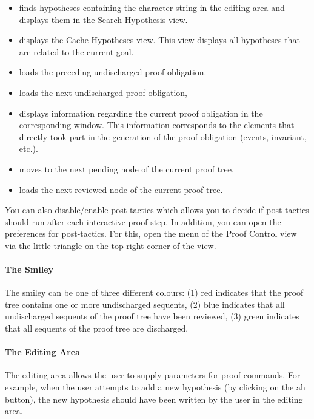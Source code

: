 \begin{itemize}
    \item {} finds hypotheses containing the character string in the editing area and displays them in the Search Hypothesis view.
    \item {} displays the \textsf{Cache Hypotheses} view. This view displays all hypotheses that are related to the current goal.
    \item {} loads the preceding undischarged proof obligation.
    \item {} loads the next undischarged proof obligation,
    \item {} displays information regarding the current proof obligation in the corresponding window. This information corresponds to the elements that directly took part in the generation of the proof obligation (events, invariant, etc.).
    \item {} moves to the next pending node of the current proof tree,
    \item {} loads the next reviewed node of the current proof tree.
\end{itemize}

You can also disable/enable post-tactics which allows you to decide if post-tactics should run after each interactive proof step. In addition, you can open the preferences for post-tactics. For this, open the menu of the \textsf{Proof Control} view via the little triangle on the top right corner of the view.

\paragraph{The Smiley}

The smiley can be one of three different colours: (1) red indicates that the proof tree contains one or more undischarged sequents, (2) blue indicates that all undischarged sequents of the proof tree have been reviewed, (3) green indicates that all sequents of the proof tree are discharged.

\paragraph{The Editing Area}

The editing area allows the user to supply parameters for proof commands. For example, when the user attempts to add a new hypothesis (by clicking on the ah button), the new hypothesis should have been written by the user in the editing area.

